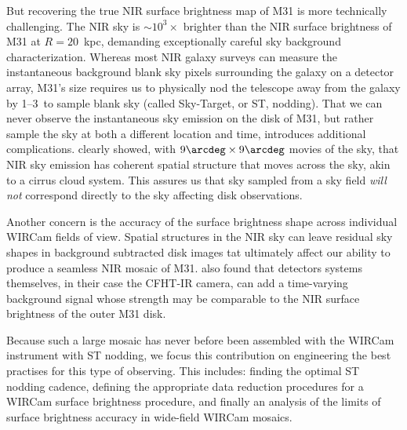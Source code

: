 \documentclass[iop]{emulateapj}
\begin{document}
But recovering the true NIR surface brightness map of M31 is more technically challenging.
The NIR sky is $\sim 10^3\times$ brighter than the NIR surface brightness of M31 at $R=20$~kpc, demanding exceptionally careful sky background characterization.
Whereas most NIR galaxy surveys can measure the instantaneous background blank sky pixels surrounding the galaxy on a detector array, M31's size requires us to physically nod the telescope away from the galaxy by 1\arcdeg--3\arcdeg\ to sample blank sky (called Sky-Target, or ST, nodding).
That we can never observe the instantaneous sky emission on the disk of M31, but rather sample the sky at both a different location and time, introduces additional complications.
\cite{Adams:1996} clearly showed, with $9\arcdeg \times 9\arcdeg$ movies of the sky, that NIR sky emission has coherent spatial structure that moves across the sky, akin to a cirrus cloud system.
This assures us that sky sampled from a sky field \emph{will not} correspond directly to the sky affecting disk observations.

Another concern is the accuracy of the surface brightness shape across individual WIRCam fields of view.
Spatial structures in the NIR sky can leave residual sky shapes in background subtracted disk images tat ultimately affect our ability to produce a seamless NIR mosaic of M31.
\cite{Vaduvescu:2004} also found that detectors systems themselves, in their case the CFHT-IR camera, can add a time-varying background signal whose strength may be comparable to the NIR surface brightness of the outer M31 disk.

Because such a large mosaic has never before been assembled with the WIRCam instrument with ST nodding, we focus this contribution on engineering the best practises for this type of observing.
This includes: finding the optimal ST nodding cadence, defining the appropriate data reduction procedures for a WIRCam surface brightness procedure, and finally an analysis of the limits of surface brightness accuracy in wide-field WIRCam mosaics.
\end{document}
